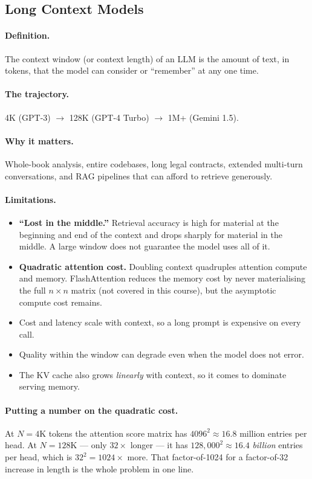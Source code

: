 \documentclass[11pt,a4paper]{article}
\begin{document}
\subsection{Long Context Models}

\paragraph{Definition.} The context window (or context length) of an LLM is the amount of
text, in tokens, that the model can consider or ``remember'' at any one time.

\paragraph{The trajectory.} 4K (GPT-3) $\rightarrow$ 128K (GPT-4 Turbo) $\rightarrow$ 1M+
(Gemini 1.5).

\paragraph{Why it matters.} Whole-book analysis, entire codebases, long legal contracts,
extended multi-turn conversations, and RAG pipelines that can afford to retrieve generously.

\paragraph{Limitations.}
\begin{itemize}
\item \textbf{``Lost in the middle.''} Retrieval accuracy is high for material at the
  beginning and end of the context and drops sharply for material in the middle. A large
  window does not guarantee the model uses all of it.
\item \textbf{Quadratic attention cost.} Doubling context quadruples attention compute and
  memory. FlashAttention reduces the memory cost by never materialising the full $n \times n$
  matrix (not covered in this course), but the asymptotic compute cost remains.
\item Cost and latency scale with context, so a long prompt is expensive on every call.
\item Quality within the window can degrade even when the model does not error.
\item The KV cache also grows \emph{linearly} with context, so it comes to dominate serving
  memory.
\end{itemize}

\paragraph{Putting a number on the quadratic cost.} At $N = 4$K tokens the attention score
matrix has $4096^2 \approx 16.8$ million entries per head. At $N = 128$K --- only $32\times$
longer --- it has $128{,}000^2 \approx 16.4$ \emph{billion} entries per head, which is
$32^2 = 1024\times$ more. That factor-of-1024 for a factor-of-32 increase in length is the
whole problem in one line.
\end{document}

